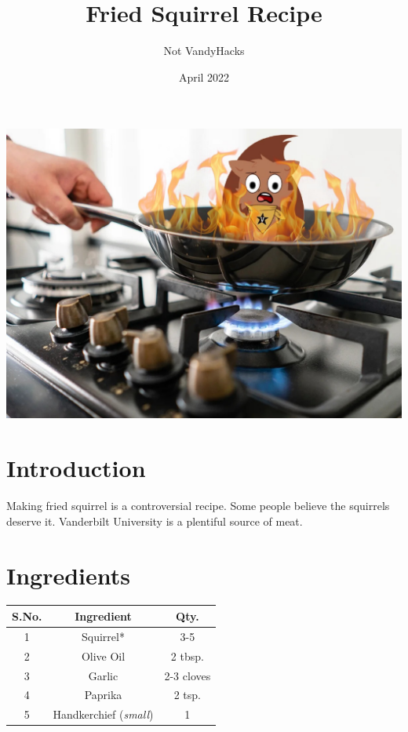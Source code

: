\documentclass{article}
\title{Fried Squirrel Recipe}
\author{Not VandyHacks }
\date{April 2022}
\begin{document}
\maketitle

\begin{center}
    \includegraphics[scale=0.2]{FRIED_SQUIRREL.jpg}
\end{center}

\section{Introduction}
Making fried squirrel is a controversial recipe. Some people believe the squirrels deserve it. Vanderbilt University is a plentiful source of meat.

\section{Ingredients}
\begin{center}
    \begin{tabular}{|c|c|c|}
    \hline
    S.No. & Ingredient & Qty.\\
    \hline \hline
       1  &  Squirrel* & 3-5 \\
       \hline
    2 & Olive Oil & 2 tbsp. \\
    \hline
    3 & Garlic & 2-3 cloves \\
    \hline
    4 & Paprika & 2 tsp. \\
    \hline
    5 & Handkerchief (\textit{small}) & 1 \\
    \hline
    \end{tabular}
\end{center}
\end{document}
